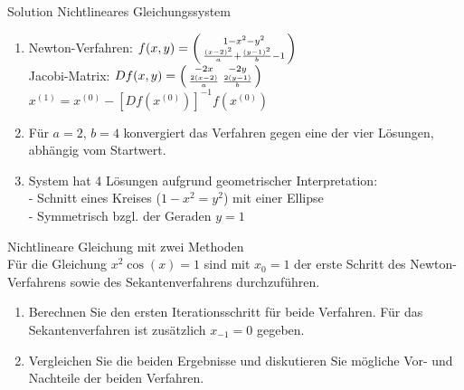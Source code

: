 \begin{KR}{Solution Nichtlineares Gleichungssystem}
\begin{enumerate}
    \item Newton-Verfahren:
    $f(x,y) = \begin{psmallmatrix} 1-x^2-y^2\\ \frac{(x-2)^2}{a} + \frac{(y-1)^2}{b} - 1 \end{psmallmatrix}$\\
    
    Jacobi-Matrix:
    $Df(x,y) = \begin{psmallmatrix} 
    -2x & -2y\\
    \frac{2(x-2)}{a} & \frac{2(y-1)}{b}
    \end{psmallmatrix}$\\
    $x^{(1)} = x^{(0)} - [Df(x^{(0)})]^{-1}f(x^{(0)})$
    
    \item Für $a=2$, $b=4$ konvergiert das Verfahren gegen eine der vier Lösungen, abhängig vom Startwert.
    
    \item System hat 4 Lösungen aufgrund geometrischer Interpretation:\\
    - Schnitt eines Kreises ($1-x^2=y^2$) mit einer Ellipse\\
    - Symmetrisch bzgl. der Geraden $y=1$
\end{enumerate}
\end{KR}

\begin{example2}{Nichtlineare Gleichung mit zwei Methoden}\\
Für die Gleichung
$x^2\cos(x) = 1$
sind mit $x_0 = 1$ der erste Schritt des Newton-Verfahrens sowie des Sekantenverfahrens durchzuführen.
\begin{enumerate}
    \item Berechnen Sie den ersten Iterationsschritt für beide Verfahren. Für das Sekantenverfahren ist zusätzlich $x_{-1} = 0$ gegeben.
    
    \item Vergleichen Sie die beiden Ergebnisse und diskutieren Sie mögliche Vor- und Nachteile der beiden Verfahren.
\end{enumerate}
\end{example2}

